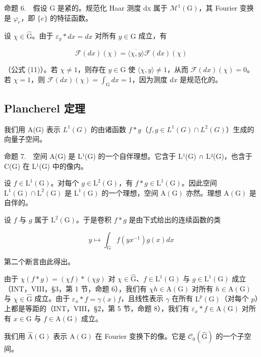 命题 6.　假设 G 是紧的。规范化 Haar 测度 dx 属于 \(\mathcal{M}^{1}(\mathrm{G})\)，其 Fourier 变换是 \(\varphi_{e}\)，即 \(\{e\}\) 的特征函数。

设 \(\chi \in \widehat{\mathrm{G}}\)。由于 \(\varepsilon_y * dx = dx\) 对所有 \(y \in \mathrm{G}\) 成立，有

\[
\mathcal {F} (d x) (\chi) = \overline {{\langle \chi , y \rangle}} \mathcal {F} (d x) (\chi)
\]

（公式 (11)）。若 \(\chi \neq 1\)，则存在 \(y \in \mathrm{G}\) 使 \(\langle \chi, y \rangle \neq 1\)，从而 \(\mathcal{F}(dx)(\chi) = 0\)。若 \(\chi = 1\)，则 \(\mathcal{F}(dx)(\chi) = \int_{\mathrm{G}} dx = 1\)，因为测度 \(dx\) 是规范化的。

\subsection{Plancherel 定理}

我们用 A(G) 表示 \(L^{1}(G)\) 的由诸函数 \(f * g\)（\(f, g \in L^{1}(G) \cap L^{2}(G)\)）生成的向量子空间。

命题 7.　空间 A(G) 是 L¹(G) 的一个自伴理想。它含于 L¹(G) ∩ L²(G)，也含于 C(G) 在 L¹(G) 中的像内。

设 \(f \in \mathrm{L}^1(\mathrm{G})\)。对每个 \(g \in \mathrm{L}^2(\mathrm{G})\)，有 \(f * g \in \mathrm{L}^1(\mathrm{G})\)。因此空间 \(\mathrm{L}^1(\mathrm{G}) \cap \mathrm{L}^2(\mathrm{G})\) 是 \(\mathrm{L}^1(\mathrm{G})\) 的一个理想，空间 \(\mathrm{A}(\mathrm{G})\) 亦然。理想 \(\mathrm{A}(\mathrm{G})\) 是自伴的。

设 \(f\) 与 \(g\) 属于 \(\mathrm{L}^2(\mathrm{G})\)。于是卷积 \(f * g\) 是由下式给出的连续函数的类

\[
y \mapsto \int_ {\mathrm{G}} f (y x ^ {- 1}) g (x) d x
\]

第二个断言由此得出。

由于 \(\chi(f*g) = (\chi f)*( \chi g)\) 对 \(\chi \in \widehat{\mathrm{G}}\)、\(f \in \mathrm{L}^1(\mathrm{G})\) 与 \(g \in \mathrm{L}^1(\mathrm{G})\) 成立（INT，VIII，§3，第 1 节，命题 6），我们有 \(\chi h \in \mathrm{A}(\mathrm{G})\) 对所有 \(h \in \mathrm{A}(\mathrm{G})\) 与 \(\chi \in \widehat{\mathrm{G}}\) 成立。由于 \(\varepsilon_x * f = \gamma(x)f\)，且线性表示 \(\gamma\) 在所有 \(\mathrm{L}^p(\mathrm{G})\)（对每个 \(p\)）上都是等距的（INT，VIII，§2，第 5 节，命题 8），我们有 \(\varepsilon_x * f \in \mathrm{A}(\mathrm{G})\) 对所有 \(x \in \mathrm{G}\) 与 \(f \in \mathrm{A}(\mathrm{G})\) 成立。

我们用 \(\widehat{\mathrm{A}}(\mathrm{G})\) 表示 \(\mathrm{A}(\mathrm{G})\) 在 Fourier 变换下的像。它是 \(\mathcal{C}_0(\widehat{\mathrm{G}})\) 的一个子空间。

